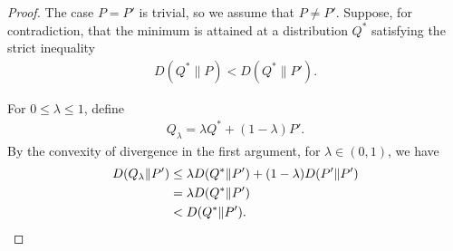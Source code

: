 \documentclass[journal,onecolumn]{IEEEtran}
\theoremstyle{definition}
\theoremstyle{remark}
\begin{document}
    \begin{proof}
    The case $P=P'$ is trivial, so we assume that $P\neq P'$.
    Suppose, for contradiction, that the minimum is attained at a distribution $Q^*$ satisfying the strict inequality
    \begin{align*}
        D(Q^*\|P)<D(Q^*\|P').
    \end{align*}
    
    For $0 \leq \lambda \leq 1$, define
    \begin{align*}
        Q_\lambda=\lambda Q^*+(1-\lambda)P'.
    \end{align*}
    By the convexity of divergence in the first argument, for $\lambda \in (0,1)$, we have
    \begin{align}
        D(Q_\lambda\|P')&\leq \lambda D(Q^*\|P')+(1-\lambda)D(P'\|P')\notag\\ 
        &=\lambda D(Q^*\|P')\notag\\
        &< D(Q^*\|P'). \label{eq:divergence to P'}
    \end{align}


\end{proof}
\end{document}
